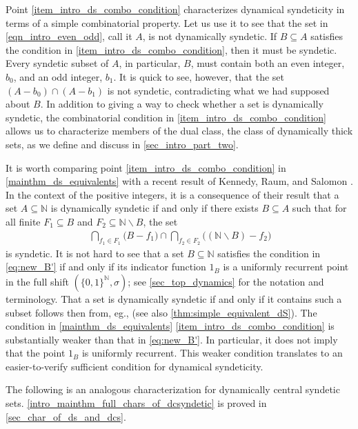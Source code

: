 \documentclass[letter,11pt]{article}
\theoremstyle{plain}
\theoremstyle{definition}
\theoremstyle{plain}
\theoremstyle{plain}
\numberwithin{equation}{section}
\newcommand{\N}{\mathbb{N}}
\renewcommand{\setminus}{\backslash}
\begin{document}
Point \eqref{item_intro_ds_combo_condition} characterizes dynamical syndeticity in terms of a simple combinatorial property.  Let us use it to see that the set in \eqref{eqn_intro_even_odd}, call it $A$, is not dynamically syndetic.  If $B \subseteq A$ satisfies the condition in \eqref{item_intro_ds_combo_condition}, then it must be syndetic.  Every syndetic subset of $A$, in particular, $B$, must contain both an even integer, $b_0$, and an odd integer, $b_1$.  It is quick to see, however, that the set $(A - b_0) \cap (A-b_1)$ is not syndetic, contradicting what we had supposed about $B$.  In addition to giving a way to check whether a set is dynamically syndetic, the combinatorial condition in \eqref{item_intro_ds_combo_condition} allows us to characterize members of the dual class, the class of dynamically thick sets, as we define and discuss in \cref{sec_intro_part_two}.  

It is worth comparing point \eqref{item_intro_ds_combo_condition} in \cref{mainthm_ds_equivalents} with a recent result of Kennedy, Raum, and Salomon \cite[Thm. 8.2]{kennedy_raum_salomon_2022}. In the context of the positive integers, it is a consequence of their result that a set $A \subseteq \N$ is dynamically syndetic if and only if there exists $B \subseteq A$ such that for all finite $F_1 \subseteq B$ and $F_2 \subseteq \N \setminus B$, the set 
\begin{align}\
\label{eq:new_B'}
    \bigcap_{f_1 \in F_1} \big(B - f_1\big)  \cap  \bigcap_{f_2 \in F_2} \big((\N \setminus B) - f_2\big)
\end{align}
is syndetic.  It is not hard to see that a set $B \subseteq \N$ satisfies the condition in \eqref{eq:new_B'} if and only if its indicator function $1_B$ is a uniformly recurrent point in the full shift $(\{0,1\}^{\N}, \sigma)$; see \cref{sec_top_dynamics} for the notation and terminology.  That a set is dynamically syndetic if and only if it contains such a subset follows then from, eg., \cite[Prop. 2.3]{huang_ye_2005} (see also \cref{thm:simple_equivalent_dS}).  The condition in \cref{mainthm_ds_equivalents} \eqref{item_intro_ds_combo_condition} is substantially weaker than that in \eqref{eq:new_B'}.  In particular, it does not imply that the point $1_B$ is uniformly recurrent.  This weaker condition translates to an easier-to-verify sufficient condition for dynamical syndeticity.

The following is an analogous characterization for dynamically central syndetic sets. \cref{intro_mainthm_full_chars_of_dcsyndetic} is proved in \cref{sec_char_of_ds_and_dcs}.
\end{document}
